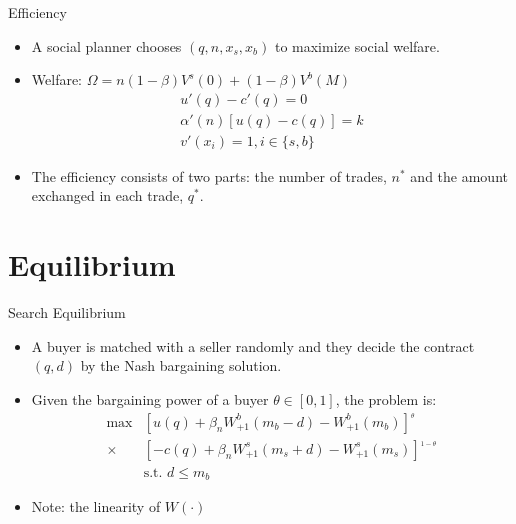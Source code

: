 \documentclass{beamer}
\begin{document}
\begin{frame}{Efficiency}
    \begin{itemize}
        \item A social planner chooses $(q,n,x_{s},x_{b})$ to maximize social welfare.
        \item Welfare: $\Omega = n(1-\beta)V^{s}(0)+(1-\beta)V^{b}(M)$
        \begin{align*}
            u'(q)-c'(q) = 0\\
            \alpha'(n)\left[u(q)-c(q)\right] = k\\
            v'(x_{i}) = 1, i\in \{s,b\}
        \end{align*}
        \item The efficiency consists of two parts: the number of trades, $n^{*}$ and the amount exchanged in each trade, $q^{*}$.
    \end{itemize}
    
\end{frame}

\section{Equilibrium}

\begin{frame}{Search Equilibrium}
    \begin{itemize}
        \item A buyer is matched with a seller randomly and they decide the contract $(q,d) $ by the Nash bargaining solution.  
        \item Given the bargaining power of a buyer $\theta \in [0,1]$, the problem is:
     \begin{align*}
         \max &\left[u(q)+\beta_{n}W_{+1}^{b}(m_{b}-d)-W_{+1}^{b}(m_{b})\right]^_{\theta}\\\times &\left[-c(q)+\beta_{n}W_{+1}^{s}(m_{s}+d)-W_{+1}^{s}(m_{s})\right]^_{1-\theta}\\
         &\text{s.t. } d\leq m_{b}
     \end{align*}
    \item Note: the linearity of $W(\cdot)$ 

    \end{itemize}
\end{frame}
\end{document}
